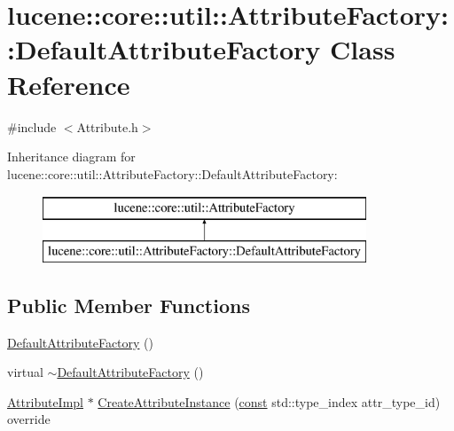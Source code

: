 \hypertarget{classlucene_1_1core_1_1util_1_1AttributeFactory_1_1DefaultAttributeFactory}{}\section{lucene\+:\+:core\+:\+:util\+:\+:Attribute\+Factory\+:\+:Default\+Attribute\+Factory Class Reference}
\label{classlucene_1_1core_1_1util_1_1AttributeFactory_1_1DefaultAttributeFactory}


{\ttfamily \#include $<$Attribute.\+h$>$}

Inheritance diagram for lucene\+:\+:core\+:\+:util\+:\+:Attribute\+Factory\+:\+:Default\+Attribute\+Factory\+:\begin{figure}[H]
\begin{center}
\leavevmode
\includegraphics[height=2.000000cm]{classlucene_1_1core_1_1util_1_1AttributeFactory_1_1DefaultAttributeFactory}
\end{center}
\end{figure}
\subsection*{Public Member Functions}
\begin{DoxyCompactItemize}
\item 
\mbox{\hyperlink{classlucene_1_1core_1_1util_1_1AttributeFactory_1_1DefaultAttributeFactory_aa5249c715ab28f13919c833b779e6351}{Default\+Attribute\+Factory}} ()
\item 
virtual \mbox{\hyperlink{classlucene_1_1core_1_1util_1_1AttributeFactory_1_1DefaultAttributeFactory_a564f172e63c8c5c4f01cf9ec95a10e5f}{$\sim$\+Default\+Attribute\+Factory}} ()
\item 
\mbox{\hyperlink{classlucene_1_1core_1_1util_1_1AttributeImpl}{Attribute\+Impl}} $\ast$ \mbox{\hyperlink{classlucene_1_1core_1_1util_1_1AttributeFactory_1_1DefaultAttributeFactory_af9b68def67fc7995d2c5e9f3d1560f5e}{Create\+Attribute\+Instance}} (\mbox{\hyperlink{ZlibCrc32_8h_a2c212835823e3c54a8ab6d95c652660e}{const}} std\+::type\+\_\+index attr\+\_\+type\+\_\+id) override
\end{DoxyCompactItemize}
